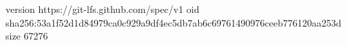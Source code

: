 version https://git-lfs.github.com/spec/v1
oid sha256:53a1f52d1d84979ca0c929a9df4ec5db7ab6c69761490976ceeb776120aa253d
size 67276
